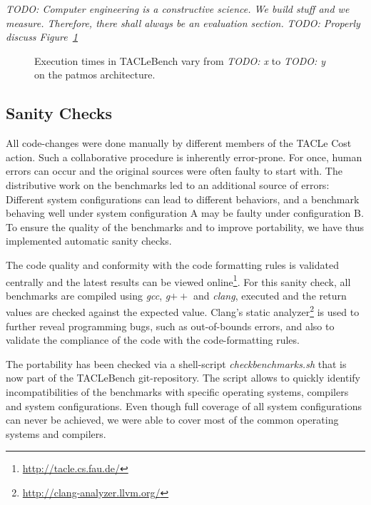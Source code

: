 \documentclass[a4paper,UKenglish]{oasics}
\newcommand{\todo}[1]{{\emph{TODO: #1}}}
\begin{document}
\todo{Computer engineering is a constructive science. We build stuff and we measure.
Therefore, there shall always be an evaluation section.}
\todo{Properly discuss Figure~\ref{fig:execution-times}}
\begin{figure}[t]
  \def\resultfile{eval/wcet.csv}
  
  \caption{Execution times in TACLeBench vary from \todo{x} to \todo{y} on the patmos architecture.}
  \label{fig:execution-times}
\end{figure}

\subsection{Sanity Checks}
All code-changes were done manually by different members of the TACLe Cost action.
Such a collaborative procedure is inherently error-prone. 
For once, human errors can occur and the original sources were often faulty to start with.
The distributive work on the benchmarks led to an additional source of errors: 
Different system configurations can lead to different behaviors, and a benchmark behaving well under system configuration A may be faulty under configuration B.
To ensure the quality of the benchmarks and to improve portability, we have thus implemented automatic sanity checks. 

The code quality and conformity with the code formatting rules is validated centrally and the latest results can be viewed online\footnote{\url{http://tacle.cs.fau.de/}}. 
For this sanity check, all benchmarks are compiled using \textit{gcc}, \textit{g$++$} and \textit{clang}, executed and the return values are checked against the expected value. 
Clang's static analyzer\footnote{\url{http://clang-analyzer.llvm.org/}} is used to further reveal programming bugs, such as out-of-bounds errors, and also to validate the compliance of the code with the code-formatting rules.

The portability has been checked via a shell-script \textit{checkbenchmarks.sh} that is now part of the TACLeBench git-repository.
The script allows to quickly identify incompatibilities of the benchmarks with specific operating systems, compilers and system configurations.
Even though full coverage of all system configurations can never be achieved, we were able to cover most of the common operating systems and compilers.

\end{document}
